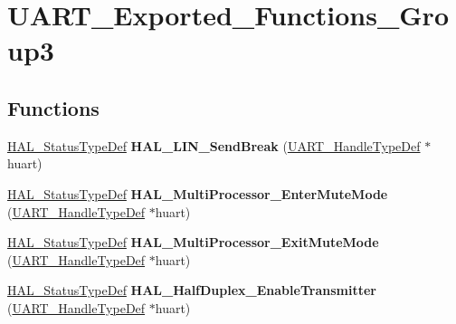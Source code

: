 \hypertarget{group___u_a_r_t___exported___functions___group3}{}\section{U\+A\+R\+T\+\_\+\+Exported\+\_\+\+Functions\+\_\+\+Group3}
\label{group___u_a_r_t___exported___functions___group3}
\subsection*{Functions}
\begin{DoxyCompactItemize}
\item 
\hyperlink{stm32f4xx__hal__def_8h_a63c0679d1cb8b8c684fbb0632743478f}{H\+A\+L\+\_\+\+Status\+Type\+Def} {\bfseries H\+A\+L\+\_\+\+L\+I\+N\+\_\+\+Send\+Break} (\hyperlink{struct_u_a_r_t___handle_type_def}{U\+A\+R\+T\+\_\+\+Handle\+Type\+Def} $\ast$huart)\hypertarget{group___u_a_r_t___exported___functions___group3_gaffbf11fb4929f709004a11675cd25fcf}{}\label{group___u_a_r_t___exported___functions___group3_gaffbf11fb4929f709004a11675cd25fcf}

\item 
\hyperlink{stm32f4xx__hal__def_8h_a63c0679d1cb8b8c684fbb0632743478f}{H\+A\+L\+\_\+\+Status\+Type\+Def} {\bfseries H\+A\+L\+\_\+\+Multi\+Processor\+\_\+\+Enter\+Mute\+Mode} (\hyperlink{struct_u_a_r_t___handle_type_def}{U\+A\+R\+T\+\_\+\+Handle\+Type\+Def} $\ast$huart)\hypertarget{group___u_a_r_t___exported___functions___group3_ga659637545299b91d2a77dadaf7266bf2}{}\label{group___u_a_r_t___exported___functions___group3_ga659637545299b91d2a77dadaf7266bf2}

\item 
\hyperlink{stm32f4xx__hal__def_8h_a63c0679d1cb8b8c684fbb0632743478f}{H\+A\+L\+\_\+\+Status\+Type\+Def} {\bfseries H\+A\+L\+\_\+\+Multi\+Processor\+\_\+\+Exit\+Mute\+Mode} (\hyperlink{struct_u_a_r_t___handle_type_def}{U\+A\+R\+T\+\_\+\+Handle\+Type\+Def} $\ast$huart)\hypertarget{group___u_a_r_t___exported___functions___group3_ga81b90fb3a4d7a8601a92260edbd3422f}{}\label{group___u_a_r_t___exported___functions___group3_ga81b90fb3a4d7a8601a92260edbd3422f}

\item 
\hyperlink{stm32f4xx__hal__def_8h_a63c0679d1cb8b8c684fbb0632743478f}{H\+A\+L\+\_\+\+Status\+Type\+Def} {\bfseries H\+A\+L\+\_\+\+Half\+Duplex\+\_\+\+Enable\+Transmitter} (\hyperlink{struct_u_a_r_t___handle_type_def}{U\+A\+R\+T\+\_\+\+Handle\+Type\+Def} $\ast$huart)\hypertarget{group___u_a_r_t___exported___functions___group3_ga58d73e260a5536fb9cb40d7d2fe2b4bb}{}\label{group___u_a_r_t___exported___functions___group3_ga58d73e260a5536fb9cb40d7d2fe2b4bb}


\end{DoxyCompactItemize}
